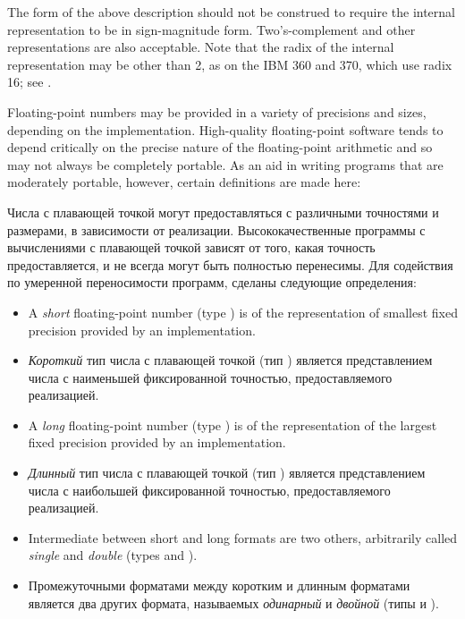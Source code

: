 \beforenoterule
\begin{implementation}
The form of the above description should not be construed
to require the internal representation to be in sign-magnitude form.
Two's-complement and other representations are also acceptable.  Note
that the radix of the internal representation may be other than 2, as on
the IBM 360 and 370, which use radix 16; see
.
\end{implementation}
\afternoterule

Floating-point numbers may be provided in a variety of precisions and sizes,
depending on the implementation.  High-quality floating-point
software tends to depend critically on the precise nature of the
floating-point arithmetic and so may not always be completely portable.
As an aid in writing programs that are
moderately portable, however, certain definitions are made here:

Числа с плавающей точкой могут предоставляться с различными точностями и
размерами, в зависимости от реализации. Высококачественные программы с
вычислениями с плавающей точкой зависят от того, какая точность предоставляется,
и не всегда могут быть полностью перенесимы. Для содействия по умеренной
переносимости программ, сделаны следующие определения:
\begin{itemize}
\item
A \emph{short} floating-point number (type )
is of the representation of smallest
fixed precision provided by an implementation.

\item
\emph{Короткий} тип числа с плавающей точкой (тип ) является
представлением числа с наименьшей фиксированной точностью, предоставляемого реализацией.

\item
A \emph{long} floating-point number (type )
is of the representation of the largest fixed 
precision provided by an implementation.

\item
\emph{Длинный} тип числа с плавающей точкой (тип ) является
представлением числа с наибольшей фиксированной точностью, предоставляемого реализацией.

\item
Intermediate between short and long formats are two others, arbitrarily
called \emph{single} and \emph{double} (types  and ).

\item
Промежуточными форматами между коротким и длинным форматами является два других
формата, называемых \emph{одинарный} и \emph{двойной} (типы  и ).
\end{itemize}

